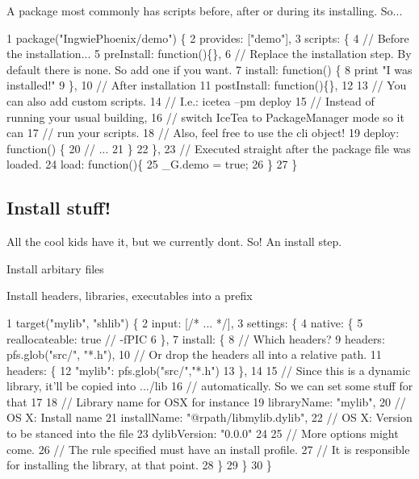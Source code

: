 A package most commonly has scripts before, after or during its installing. So... 
\begin{DoxyCode}
1 package("IngwiePhoenix/demo") \{
2     provides: ["demo"],
3     scripts: \{
4         // Before the installation...
5         preInstall: function()\{\},
6         // Replace the installation step. By default there is none. So add one if you want.
7         install: function() \{
8             print "I was installed!"
9         \},
10         // After installation
11         postInstall: function()\{\},
12 
13         // You can also add custom scripts.
14         // I.e.: icetea --pm deploy
15         // Instead of running your usual building,
16         // switch IceTea to PackageManager mode so it can
17         // run your scripts.
18         // Also, feel free to use the cli object!
19         deploy: function() \{
20             // ...
21         \}
22     \},
23     // Executed straight after the package file was loaded.
24     load: function()\{
25         \_G.demo = true;
26     \}
27 \}
\end{DoxyCode}


\subsection*{Install stuff!}

All the cool kids have it, but we currently don\textquotesingle{}t. So! An install step.
\begin{DoxyItemize}
\item Install arbitary files
\item Install headers, libraries, executables into a prefix
\end{DoxyItemize}


\begin{DoxyCode}
1 target("mylib", "shlib") \{
2     input: [/* ... */],
3     settings: \{
4         native: \{
5             reallocateable: true // -fPIC
6         \},
7         install: \{
8             // Which headers?
9             headers: pfs.glob("src/", "*.h"),
10             // Or drop the headers all into a relative path.
11             headers: \{
12                 "mylib": pfs.glob("src/","*.h")
13             \},
14 
15             // Since this is a dynamic library, it'll be copied into .../lib
16             // automatically. So we can set some stuff for that
17 
18             // Library name for OSX for instance
19             libraryName: "mylib",
20             // OS X: Install name
21             installName: "@rpath/libmylib.dylib",
22             // OS X: Version to be stanced into the file
23             dylibVersion: "0.0.0"
24 
25             // More options might come.
26             // The rule specified must have an install profile.
27             // It is responsible for installing the library, at that point.
28         \}
29     \}
30 \}
\end{DoxyCode}


